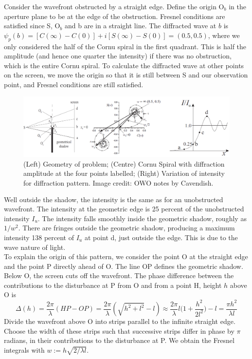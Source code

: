 \documentclass[a4paper]{article}
\begin{document}
\begin{eg}
Consider the wavefront obstructed by a straight edge. Define the origin O$_b$ in the aperture plane to be at the edge of the obstruction. Fresnel conditions are satisfied since S, O$_b$ and b are in a straight line. The diffracted wave at $b$ is $\psi_p(b)=[C(\infty)-C(0)]+i[S(\infty)-S(0)]=(0.5,0.5)$, where we only considered the half of the Cornu spiral in the first quadrant. This is half the amplitude (and hence one quarter the intensity) if there was no obstruction, which is the entire Cornu spiral. To calculate the diffracted wave at other points on the screen, we move the origin so that it is still between S and our observation point, and Fresnel conditions are still satisfied.

\begin{figure}[H]
    \centering
    \includegraphics[width=\linewidth]{fresneledge.PNG}
    \caption{(Left) Geometry of problem; (Centre) Cornu Spiral with diffraction amplitude at the four points labelled; (Right) Variation of intensity for diffraction pattern. Image credit: OWO notes by Cavendish.}
\end{figure}
Well outside the shadow, the intensity is the same as for an unobstructed wavefront. The intensity at the geometric edge is 25 percent of the unobstructed intensity $I_u$. The intensity falls smoothly inside the geometric shadow, roughly as $1/w^2$. There are fringes outside the geometric shadow, producing a maximum intensity 138 percent of $I_u$ at point d, just outside the edge. This is due to the wave nature of light.\\[5pt]
To explain the origin of this pattern, we consider the point O at the straight edge and the point P directly ahead of O. The line OP defines the geometric shadow. Below O, the screen cuts off the wavefront. The phase difference between the contributions to the disturbance at P from O and from a point H, height $h$ above O is
$$\Delta(h)=\frac{2\pi}{\lambda}(HP-OP)=\frac{2\pi}{\lambda}(\sqrt{h^2+l^2}-l)\approx\frac{2\pi}{\lambda}l\bigg(1+\frac{h^2}{2l^2}\bigg)-l=\frac{\pi h^2}{\lambda l}$$
Divide the wavefront above O into strips parallel to the infinite straight edge. Choose the width of these strips such that successive strips differ in phase by $\pi$ radians, in their contributions to the disturbance at P. We obtain the Fresnel integrals with $w:=h\sqrt{2/\lambda l}$.
\end{eg}
\end{document}
